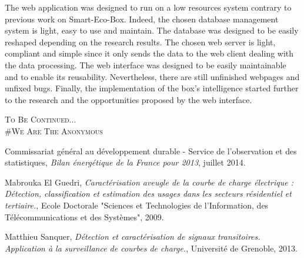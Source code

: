 The web application was designed to run on a low resources system contrary to previous work on Smart-Eco-Box. Indeed, the chosen database management system is light, easy to use and maintain. The database was designed to be easily reshaped depending on the research results. The chosen web server is light, compliant and simple since it only sends the data to the web client dealing with the data processing. The web interface was designed to be easily maintainable and to enable its reusability. Nevertheless, there are still unfinished webpages and unfixed bugs. Finally, the implementation of the box's intelligence started further to the research and the opportunities proposed by the web interface.

\begin{huge}
\textsc{To Be Continued...}\\
\textsc{\#We Are The Anonymous}
\end{huge}

\begin{thebibliography}{10}
 Commissariat g\'en\'eral au d\'eveloppement durable - Service de l'observation et des statistiques, \emph{Bilan \'energ\'etique de la France pour 2013}, juillet 2014.
 
    Mabrouka El Guedri, \emph{Caract\'erisation aveugle de la courbe de charge \'electrique : D\'etection, classification et estimation des usages dans les secteurs r\'esidentiel et tertiaire.}, Ecole Doctorale "Sciences et Technologies de l'Information, des T\'el\'ecommunications et des Syst\`emes", 2009.
 
    Matthieu Sanquer, \textit{D\'etection et caract\'erisation de signaux transitoires. Application \`a la surveillance de courbes de charge.}, Universit\'e de Grenoble, 2013.
\end{thebibliography}